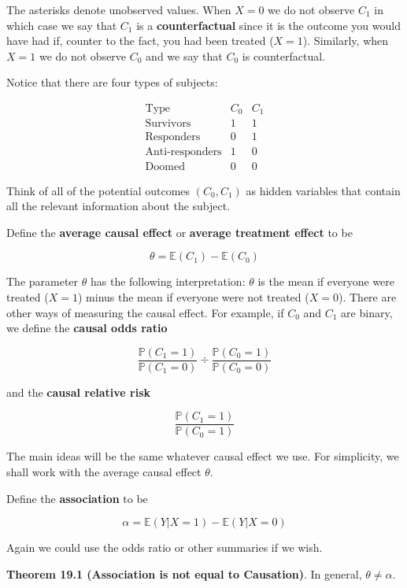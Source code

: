 The asterisks denote unobserved values. When \(X = 0\) we do not observe
\(C_{1}\) in which case we say that \(C_{1}\) is a \textbf{counterfactual}
since it is the outcome you would have had if, counter to the fact, you
had been treated (\(X = 1\)). Similarly, when \(X = 1\) we do not observe
\(C_{0}\) and we say that \(C_{0}\) is counterfactual.

Notice that there are four types of subjects:

\[
\begin{array}{lcc}
\text{Type} & C_{0} & C_{1} \\
\hline
\text{Survivors}       & 1 & 1 \\
\text{Responders}      & 0 & 1 \\
\text{Anti-responders} & 1 & 0 \\
\text{Doomed}          & 0 & 0
\end{array}
\]

Think of all of the potential outcomes \((C_{0}, C_{1})\) as hidden
variables that contain all the relevant information about the subject.

Define the \textbf{average causal effect} or \textbf{average treatment
effect} to be

\[ \theta = \mathbb{E}(C_{1}) - \mathbb{E}(C_{0}) \]

The parameter \(\theta\) has the following interpretation: \(\theta\) is
the mean if everyone were treated (\(X = 1\)) minus the mean if everyone
were not treated (\(X = 0\)). There are other ways of measuring the
causal effect. For example, if \(C_{0}\) and \(C_{1}\) are binary, we define
the \textbf{causal odds ratio}

\[ \frac{\mathbb{P}(C_{1} = 1)}{\mathbb{P}(C_{1} = 0)} \div \frac{\mathbb{P}(C_{0} = 1)}{\mathbb{P}(C_{0} = 0)}\]

and the \textbf{causal relative risk}

\[ \frac{\mathbb{P}(C_{1} = 1)}{\mathbb{P}(C_{0} = 1)} \]

The main ideas will be the same whatever causal effect we use. For
simplicity, we shall work with the average causal effect \(\theta\).

Define the \textbf{association} to be

\[ \alpha = \mathbb{E}(Y | X = 1) - \mathbb{E}(Y | X = 0)\]

Again we could use the odds ratio or other summaries if we wish.

\textbf{Theorem 19.1 (Association is not equal to Causation)}. In
general, \(\theta \neq \alpha\).

